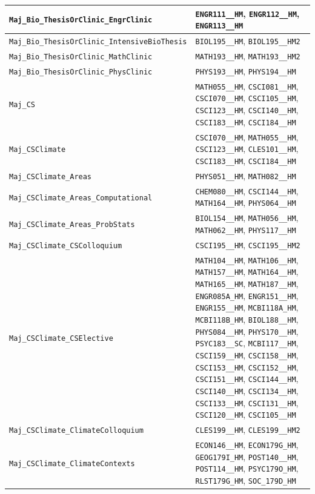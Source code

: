\begin{longtable}{|p{4.4in}|p{4.4in}|}
    \verb|Maj_Bio_ThesisOrClinic_EngrClinic| & \verb|ENGR111__HM|, \verb|ENGR112__HM|, \verb|ENGR113__HM|\\\hline
    \verb|Maj_Bio_ThesisOrClinic_IntensiveBioThesis| & \verb|BIOL195__HM|, \verb|BIOL195__HM2|\\\hline
    \verb|Maj_Bio_ThesisOrClinic_MathClinic| & \verb|MATH193__HM|, \verb|MATH193__HM2|\\\hline
    \verb|Maj_Bio_ThesisOrClinic_PhysClinic| & \verb|PHYS193__HM|, \verb|PHYS194__HM|\\\hline
    \verb|Maj_CS| & \verb|MATH055__HM|, \verb|CSCI081__HM|, \verb|CSCI070__HM|, \verb|CSCI105__HM|, \verb|CSCI123__HM|, \verb|CSCI140__HM|, \verb|CSCI183__HM|, \verb|CSCI184__HM|\\\hline
    \verb|Maj_CSClimate| & \verb|CSCI070__HM|, \verb|MATH055__HM|, \verb|CSCI123__HM|, \verb|CLES101__HM|, \verb|CSCI183__HM|, \verb|CSCI184__HM|\\\hline
    \verb|Maj_CSClimate_Areas| & \verb|PHYS051__HM|, \verb|MATH082__HM|\\\hline
    \verb|Maj_CSClimate_Areas_Computational| & \verb|CHEM080__HM|, \verb|CSCI144__HM|, \verb|MATH164__HM|, \verb|PHYS064__HM|\\\hline
    \verb|Maj_CSClimate_Areas_ProbStats| & \verb|BIOL154__HM|, \verb|MATH056__HM|, \verb|MATH062__HM|, \verb|PHYS117__HM|\\\hline
    \verb|Maj_CSClimate_CSColloquium| & \verb|CSCI195__HM|, \verb|CSCI195__HM2|\\\hline
    \verb|Maj_CSClimate_CSElective| & \verb|MATH104__HM|, \verb|MATH106__HM|, \verb|MATH157__HM|, \verb|MATH164__HM|, \verb|MATH165__HM|, \verb|MATH187__HM|, \verb|ENGR085A_HM|, \verb|ENGR151__HM|, \verb|ENGR155__HM|, \verb|MCBI118A_HM|, \verb|MCBI118B_HM|, \verb|BIOL188__HM|, \verb|PHYS084__HM|, \verb|PHYS170__HM|, \verb|PSYC183__SC|, \verb|MCBI117__HM|, \verb|CSCI159__HM|, \verb|CSCI158__HM|, \verb|CSCI153__HM|, \verb|CSCI152__HM|, \verb|CSCI151__HM|, \verb|CSCI144__HM|, \verb|CSCI140__HM|, \verb|CSCI134__HM|, \verb|CSCI133__HM|, \verb|CSCI131__HM|, \verb|CSCI120__HM|, \verb|CSCI105__HM|\\\hline
    \verb|Maj_CSClimate_ClimateColloquium| & \verb|CLES199__HM|, \verb|CLES199__HM2|\\\hline
    \verb|Maj_CSClimate_ClimateContexts| & \verb|ECON146__HM|, \verb|ECON179G_HM|, \verb|GEOG179I_HM|, \verb|POST140__HM|, \verb|POST114__HM|, \verb|PSYC179O_HM|, \verb|RLST179G_HM|, \verb|SOC_179D_HM|\\\hline

\end{longtable}

